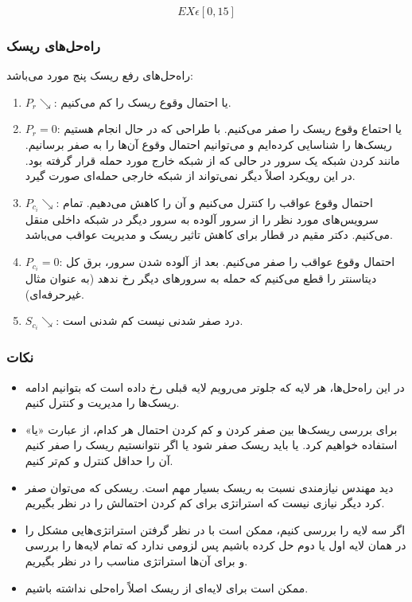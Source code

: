 \begin{equation}
    EX \epsilon [0, 15]
\end{equation}

\subsubsection{راه‌حل‌های ریسک}

راه‌حل‌های رفع ریسک پنج مورد می‌باشد:

\begin{enumerate}
    \item $P_{r} \searrow$: یا احتمال وقوع ریسک را کم می‌کنیم.
    \item $P_{r} = 0$: یا احتماع وقوع ریسک را صفر می‌کنیم. با طراحی که در حال
    انجام هستیم ریسک‌ها را شناسایی کرده‌ایم و می‌توانیم احتمال وقوع آن‌ها را به
    صفر برسانیم. مانند  کردن شبکه یک سرور در حالی که از شبکه
    خارج مورد حمله قرار گرفته بود. در این رویکرد اصلاً دیگر نمی‌تواند از شبکه
    خارجی حمله‌ای صورت گیرد.
    \item $P_{c_{i}} \searrow$: احتمال وقوع عواقب را کنترل می‌کنیم و آن را کاهش
    می‌دهیم. تمام سرویس‌های مورد نظر را از سرور آلوده به سرور دیگر در شبکه داخلی
    منقل می‌کنیم. دکتر مقیم در قطار برای کاهش تاثیر ریسک و مدیریت عواقب می‌باشد.
    \item $P_{c_{i}} = 0$: احتمال وقوع عواقب را صفر می‌کنیم. بعد از آلوده شدن
    سرور، برق کل دیتاسنتر را قطع می‌کنیم که حمله به سرور‌های دیگر رخ ندهد (به
    عنوان مثال غیرحرفه‌ای).
    \item $S_{c_{i}} \searrow$: درد صفر شدنی نیست کم شدنی است.
\end{enumerate}

\subsubsection*{نکات}

\begin{itemize}
    \item در این راه‌حل‌ها، هر لایه که جلوتر می‌رویم لایه قبلی رخ داده است که
    بتوانیم ادامه ریسک‌ها را مدیریت و کنترل کنیم.
    \item برای بررسی ریسک‌ها بین صفر کردن و کم کردن احتمال هر کدام، از عبارت
    «یا» استفاده خواهیم کرد. یا باید ریسک صفر شود یا اگر نتوانستیم ریسک را صفر
    کنیم آن را حداقل کنترل و کم‌تر کنیم.
    \item دید مهندس نیازمندی نسبت به ریسک بسیار مهم است. ریسکی که می‌توان صفر
    کرد دیگر نیازی نیست که استراتژی برای کم کردن احتمالش را در نظر بگیریم.
    \item اگر سه لایه را بررسی کنیم، ممکن است با در نظر گرفتن استراتژی‌هایی مشکل
    را در همان لایه اول یا دوم حل کرده باشیم پس لزومی ندارد که تمام لایه‌ها را
    بررسی و برای آن‌ها استراتژی مناسب را در نظر بگیریم.
    \item ممکن است برای لایه‌ای از ریسک اصلاً راه‌حلی نداشته باشیم.
\end{itemize}

